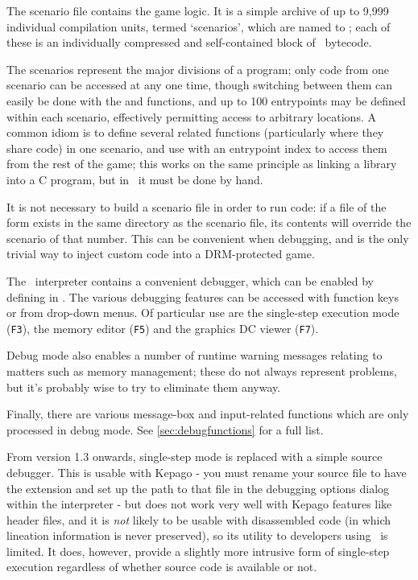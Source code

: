   
\label{sec:scenarios}

  The scenario file contains the game logic.  It is a simple archive of up to
  9,999 individual compilation units, termed `scenarios', which are named
   to ; each of these is an individually
  compressed and self-contained block of \reallive\ bytecode.

  The scenarios represent the major divisions of a program; only code from one
  scenario can be accessed at any one time, though switching between them can
  easily be done with the  and  functions, and up to
  100 entrypoints may be defined within each scenario, effectively permitting
  access to arbitrary locations.  A common idiom is to define several related
  functions (particularly where they share code) in one scenario, and use
   with an entrypoint index to access them from the rest of the
  game; this works on the same principle as linking a library into a C program,
  but in \compiler\ it must be done by hand.

  It is not necessary to build a scenario file in order to run code: if a file
  of the form  exists in the same directory as the scenario
  file, its contents will override the scenario of that number.  This can be
  convenient when debugging, and is the only trivial way to inject custom code
  into a DRM-protected game.


  The \reallive\ interpreter contains a convenient debugger, which can be 
  enabled by defining  in \gameexe.  The various debugging 
  features can be accessed with function keys or from drop-down menus. Of 
  particular use are the single-step execution mode (\texttt{F3}), the memory 
  editor (\texttt{F5}) and the graphics DC viewer (\texttt{F7}).

  Debug mode also enables a number of runtime warning messages relating to
  matters such as memory management; these do not always represent problems, but
  it's probably wise to try to eliminate them anyway.
  
  Finally, there are various message-box and input-related functions which are 
  only processed in debug mode.  See \ref{sec:debugfunctions} for a full list.
  
  From version 1.3 onwards, single-step mode is replaced with a simple source 
  debugger.  This is usable with Kepago - you must rename your source file to 
  have the extension  and set up the path to that file in the 
  debugging options dialog within the interpreter - but does not work very well 
  with Kepago features like header files, and it is \emph{not} likely to be 
  usable with disassembled code (in which lineation information is never 
  preserved), so its utility to developers using \package\ is limited.  It 
  does, however, provide a slightly more intrusive form of single-step 
  execution regardless of whether source code is available or not.

